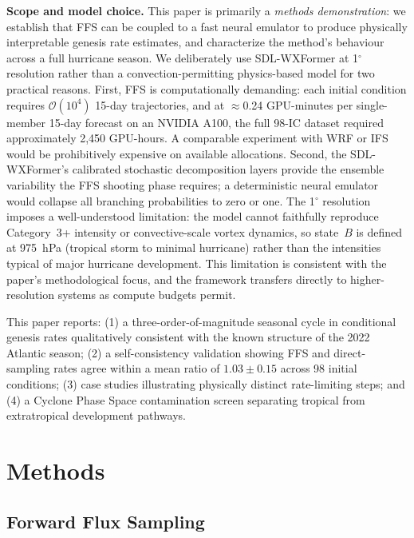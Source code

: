 \documentclass[11pt]{article}
\begin{document}
\textbf{Scope and model choice.}
This paper is primarily a \textit{methods demonstration}: we establish that FFS can be
coupled to a fast neural emulator to produce physically interpretable genesis rate
estimates, and characterize the method's behaviour across a full hurricane season.
We deliberately use SDL-WXFormer at 1$^\circ$ resolution rather than a convection-permitting
physics-based model for two practical reasons. First, FFS is computationally demanding:
each initial condition requires $\mathcal{O}(10^4)$ 15-day trajectories, and at
$\approx$0.24 GPU-minutes per single-member 15-day forecast on an NVIDIA A100, the full 98-IC dataset required
approximately 2,450 GPU-hours. A comparable experiment with WRF or IFS would be
prohibitively expensive on available allocations. Second, the SDL-WXFormer's calibrated
stochastic decomposition layers provide the ensemble variability the FFS shooting phase
requires; a deterministic neural emulator would collapse all branching probabilities to
zero or one. The 1$^\circ$ resolution imposes a well-understood limitation: the model
cannot faithfully reproduce Category~3+ intensity or convective-scale vortex dynamics,
so state~$B$ is defined at 975~hPa (tropical storm to minimal hurricane) rather than
the intensities typical of major hurricane development. This limitation is consistent
with the paper's methodological focus, and the framework transfers directly to
higher-resolution systems as compute budgets permit.

This paper reports: (1) a three-order-of-magnitude seasonal cycle in conditional genesis
rates qualitatively consistent with the known structure of the 2022 Atlantic season; (2) a self-consistency
validation showing FFS and direct-sampling rates agree within a mean ratio of
$1.03\pm0.15$ across 98 initial conditions; (3) case studies illustrating physically
distinct rate-limiting steps; and (4) a Cyclone Phase Space contamination screen
separating tropical from extratropical development pathways.

\section{Methods}

\subsection{Forward Flux Sampling}
\end{document}
